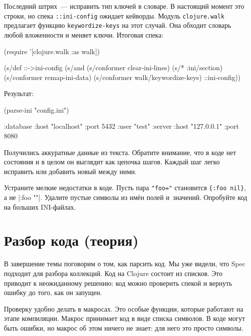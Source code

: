 \fi


Последний штрих~--- исправить тип ключей в словаре. В настоящий момент это
строки, но спека \verb|::ini-config| ожидает кейворды. Модуль
\verb|clojure.walk| предлагает функцию \verb|keywordize-keys| на этот
случай. Она обходит словарь любой вложенности и меняет ключи. Итоговая спека:

\begin{english}
  \begin{clojure}
(require '[clojure.walk :as walk])

(s/def ::->ini-config
  (s/and
   (s/conformer clear-ini-lines)
   (s/* :ini/section)
   (s/conformer remap-ini-data)
   (s/conformer walk/keywordize-keys)
   ::ini-config))
  \end{clojure}
\end{english}

\noindent
Результат:

\begin{english}
  \begin{clojure}
(parse-ini "config.ini")

{:database {:host "localhost"
            :port 5432
            :user "test"}
 :server {:host "127.0.0.1"
          :port 8080}}
  \end{clojure}
\end{english}

Получились аккуратные данные из текста. Обратите внимание, что в коде нет
состояния и в целом он выглядит как цепочка шагов. Каждый шаг легко исправить
или добавить новый между ними.

Устраните мелкие недостатки в коде. Пусть пара \verb|"foo="| становится
\verb|{:foo nil}|, а не \spverb|{:foo ""}|.  Удалите пустые символы из
имён полей и~значений. Опробуйте код на больших INI-файлах.

\section{Разбор кода (теория)}


В завершение темы поговорим о том, как парсить код. Мы уже видели, что Spec
подходит для разбора коллекций. Код на Clojure состоит из списков. Это приводит
к неожиданному решению: код можно проверить спекой и вернуть ошибку до того, как
он запущен.

Проверку удобно делать в макросах. Это особые функции, которые работают на этапе
компиляции. Макрос принимает код в виде списка символов. В коде могут быть
ошибки, но макрос об этом ничего не знает: для него это просто символы.

